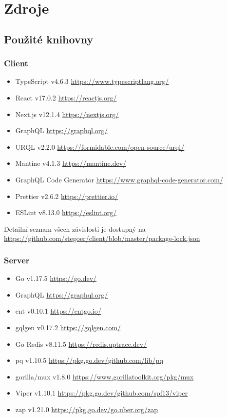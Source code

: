 
\section{Zdroje}\label{sec:zdroje}

\subsection{Použité knihovny}\label{subsec:pouzite-knihovny}

\subsubsection{Client}\label{subsubsec:client}
\begin{itemize}
    \item TypeScript v4.6.3 \url{https://www.typescriptlang.org/}
    \item React v17.0.2 \url{https://reactjs.org/}
    \item Next.js v12.1.4 \url{https://nextjs.org/}
    \item GraphQL \url{https://graphql.org/}
    \item URQL v2.2.0 \url{https://formidable.com/open-source/urql/}
    \item Mantine v4.1.3 \url{https://mantine.dev/}
    \item GraphQL Code Generator \url{https://www.graphql-code-generator.com/}
    \item Prettier v2.6.2 \url{https://prettier.io/}
    \item ESLint v8.13.0 \url{https://eslint.org/}
\end{itemize}

Detailní seznam všech závislosti je dostupný na
\url{https://github.com/stegoer/client/blob/master/package-lock.json}

\subsubsection{Server}\label{subsubsec:server}
\begin{itemize}
    \item Go v1.17.5 \url{https://go.dev/}
    \item GraphQL \url{https://graphql.org/}
    \item ent v0.10.1 \url{https://entgo.io/}
    \item gqlgen v0.17.2 \url{https://gqlgen.com/}
    \item Go Redis v8.11.5 \url{https://redis.uptrace.dev/}
    \item pq v1.10.5 \url{https://pkg.go.dev/github.com/lib/pq}
    \item gorilla/mux v1.8.0 \url{https://www.gorillatoolkit.org/pkg/mux}
    \item Viper v1.10.1 \url{https://pkg.go.dev/github.com/spf13/viper}
    \item zap v1.21.0 \url{https://pkg.go.dev/go.uber.org/zap}
\end{itemize}

